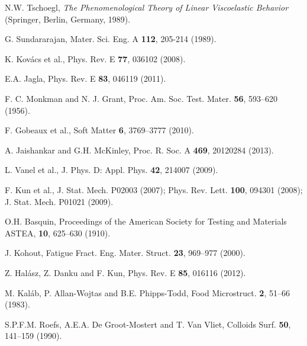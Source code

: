\documentclass[twocolumn,superscriptaddress,showpacs,preprintnumbers,amsmath,amssymb,prl]{revtex4}
\begin{document}
\begin{thebibliography}{}
  N.W. Tschoegl, {\it The Phenomenological Theory of Linear Viscoelastic Behavior} (Springer, Berlin, Germany, 1989).

 G. Sundararajan, Mater. Sci. Eng. A {\bf 112}, 205-214 (1989).

 K. Kov\'acs et al., Phys. Rev. E \textbf{77}, 036102 (2008).

 E.A. Jagla, Phys. Rev. E {\bf 83}, 046119 (2011).

 F. C. Monkman and N. J. Grant, Proc. Am. Soc. Test.
Mater. {\bf 56}, 593--620 (1956).


 F. Gobeaux et al., Soft Matter {\bf 6}, 3769--3777 (2010).

 A. Jaishankar and G.H. McKinley, Proc. R. Soc. A {\bf 469}, 20120284 (2013).

 L. Vanel et al., J. Phys. D: Appl. Phys. {\bf 42}, 214007 (2009).

 F. Kun et al., J. Stat. Mech. P02003 (2007); Phys. Rev. Lett. {\bf 100}, 094301 (2008); J. Stat. Mech. P01021 (2009).

 O.H. Basquin, Proceedings of the American Society for Testing and Materials ASTEA, {\bf 10}, 625--630 (1910).

 J. Kohout, Fatigue Fract. Eng. Mater. Struct. {\bf 23}, 969--977 (2000).


 Z. Hal\'asz, Z. Danku and F. Kun, Phys. Rev. E {\bf 85}, 016116 (2012).

 M. Kal\'ab, P. Allan-Wojtas and B.E. Phipps-Todd, Food Microstruct. {\bf 2}, 51--66 (1983).

 S.P.F.M. Roefs, A.E.A. De Groot-Mostert and T. Van Vliet, Colloids Surf. {\bf 50}, 141--159 (1990).




\end{thebibliography}
\end{document}
